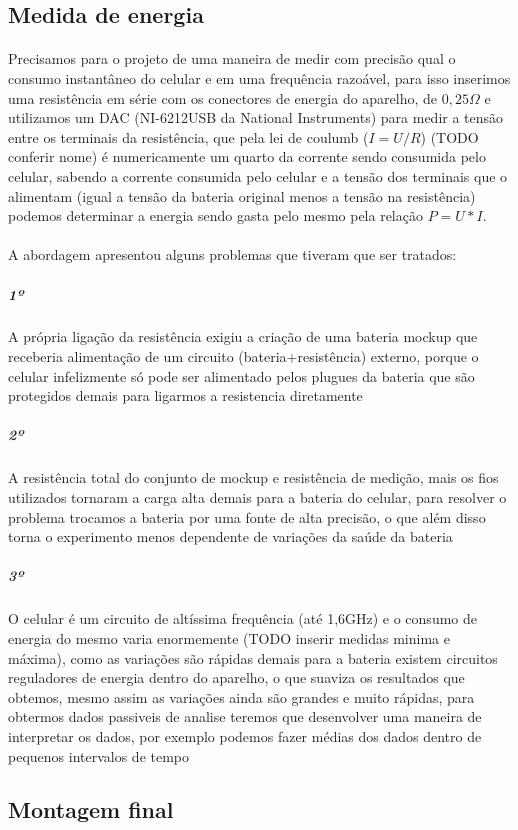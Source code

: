 \documentclass[11pt,a4paper,titlepage]{article}
\begin{document}
\subsection{Medida de energia} 
\paragraph{} Precisamos para o projeto de uma maneira de medir com precisão qual o consumo instantâneo do celular e em uma frequência razoável, para isso inserimos uma resistência em série com os conectores de energia do aparelho, de $0,25\Omega$ e utilizamos um DAC (NI-6212USB da National Instruments) para medir a tensão entre os terminais da resistência, que pela lei de coulumb ($I=U/R$) (TODO conferir nome) é numericamente um quarto da corrente sendo consumida pelo celular, sabendo a corrente consumida pelo celular e a tensão dos terminais que o alimentam (igual a tensão da bateria original menos a tensão na resistência) podemos determinar a energia sendo gasta pelo mesmo pela relação $P=U*I$.
\paragraph{} A abordagem apresentou alguns problemas que tiveram que ser tratados:
\subparagraph*{1º} A própria ligação da resistência exigiu a criação de uma bateria mockup que receberia alimentação de um circuito (bateria+resistência) externo, porque o celular infelizmente só pode ser alimentado pelos plugues da bateria que são protegidos demais para ligarmos a resistencia diretamente
\subparagraph*{2º} A resistência total do conjunto de mockup e resistência de medição, mais os fios utilizados tornaram a carga alta demais para a bateria do celular, para resolver o problema trocamos a bateria por uma fonte de alta precisão, o que além disso torna o experimento menos dependente de variações da saúde da bateria
\subparagraph*{3º} O celular é um circuito de altíssima frequência (até 1,6GHz) e o consumo de energia do mesmo varia enormemente (TODO inserir medidas minima e máxima), como as variações são rápidas demais para a bateria existem circuitos reguladores de energia dentro do aparelho, o que suaviza os resultados que obtemos, mesmo assim as variações ainda são grandes e muito rápidas, para obtermos dados passiveis de analise teremos que desenvolver uma maneira de interpretar os dados, por exemplo podemos fazer médias dos dados dentro de pequenos intervalos de tempo
\subsection{Montagem final}
\end{document}

